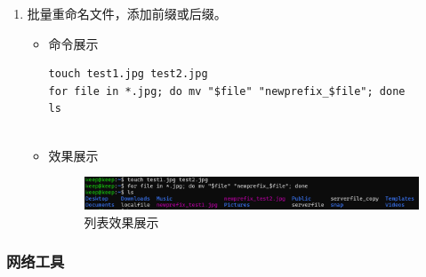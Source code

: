 \documentclass[UTF8]{ctexart}
\begin{document}
\begin{enumerate}
  \item 批量重命名文件，添加前缀或后缀。
  \begin{itemize}
  \item 命令展示
  \begin{verbatim}
touch test1.jpg test2.jpg
for file in *.jpg; do mv "$file" "newprefix_$file"; done
ls


  \end{verbatim}
\item 效果展示
  \begin{figure}[H]
    \centering
    \includegraphics[width=\textwidth]{10} %
    \caption{列表效果展示}
  \end{figure}
  \end{itemize}
\end{enumerate}

\subsubsection{网络工具}
\end{document}
